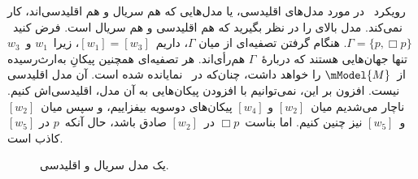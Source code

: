 \documentclass[../../../include/open-logic-section]{subfiles}
\begin{document}


رویکرد~ در مورد مدل‌های اقلیدسی، یا مدل‌هایی که هم
سریال و هم اقلیدسی‌اند، کار نمی‌کند. مدل بالای
 را در نظر بگیرید که هم اقلیدسی و هم سریال است.
فرض کنید~$\Gamma = \{p, \Box p \}$. هنگام گرفتن تصفیه‌ای از میان
$\Gamma$، داریم~$[w_1] = [w_3]$، زیرا~$w_1$ و~$w_3$ تنها جهان‌هایی
هستند که دربارهٔ~$\Gamma$ هم‌رأی‌اند. هر تصفیه‌ای همچنین پیکانِ به‌ارث‌رسیده
از~$\mModel{M}$ را خواهد داشت، چنان‌که در~
نمایانده شده است. آن مدل اقلیدسی نیست. افزون بر این، نمی‌توانیم با افزودن
پیکان‌هایی به آن مدل، اقلیدسی‌اش کنیم. ناچار می‌شدیم میان~$[w_2]$ و
$[w_4]$ پیکان‌های دوسویه بیفزاییم، و سپس میان~$[w_2]$ و~$[w_5]$ نیز
چنین کنیم. اما بناست~$\Box p$ در~$[w_2]$ صادق باشد، حال آنکه~$p$ در
$[w_5]$ کاذب است.

\begin{figure}[htpb]
  \centering
  \caption{یک مدل سریال و اقلیدسی.}
\end{figure}
\end{document}
